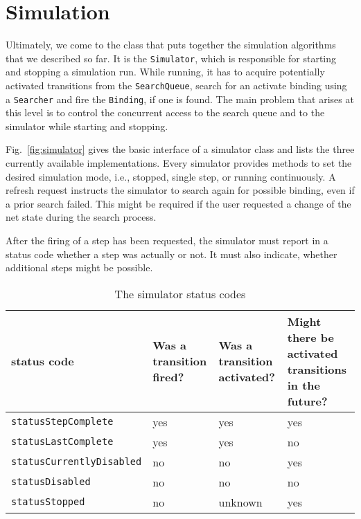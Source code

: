\section{Simulation}

Ultimately, we come to the class that puts together the
simulation algorithms that we described so far.
It is the \texttt{Simulator}, which is responsible for
starting and stopping a simulation run. While running,
it has to acquire potentially activated transitions from the
\texttt{SearchQueue}, search for an activate binding using
a \texttt{Searcher} and fire the \texttt{Binding}, 
if one is found. The main problem that arises at this level
is to control the concurrent access to the search queue
and to the simulator while starting and stopping.


Fig.~\ref{fig:simulator} gives the basic interface of a simulator class
and lists the three currently available implementations.
Every simulator provides methods to set the desired simulation mode,
i.e., stopped, single step, or running continuously.
A refresh request instructs the simulator
to search again for possible binding, even if a prior search
failed. This might be required if the user requested a
change of the net state during the search process.

After the firing of a step has been requested, 
the simulator must report in a status code whether a step was actually
or not. It must also indicate, whether additional steps might be possible.

\begin{table}[htbp]
  \begin{center}
    \begin{tabular}{lp{}p{}p{}}
      status code & \parbox[b]{2,5cm}{\raggedright Was a transi\-tion fired?}
                  & \parbox[b]{2,5cm}{\raggedright Was a transi\-tion activated?}
                  & \parbox[b]{2,5cm}{\raggedright Might there be
                    activated transi\-tions in the future?\strut} \\\hline
      \texttt{statusStepComplete} & yes & yes & yes \\\hline
      \texttt{statusLastComplete} & yes & yes & no \\\hline
      \texttt{statusCurrentlyDisabled} & no & no & yes \\\hline
      \texttt{statusDisabled} & no & no & no \\\hline
      \texttt{statusStopped} & no & unknown & yes \\
    \end{tabular}
    \caption{The simulator status codes}
    \label{tab:statuscodes}
  \end{center}
\end{table}

